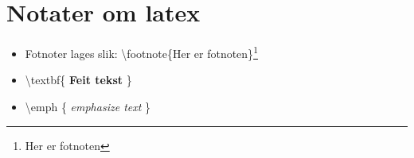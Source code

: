 \documentclass[norsk,9 pt]{report}
\begin{document}




%



%














\chapter{Notater om latex}
\begin{itemize}
	\item Fotnoter lages slik: \textbackslash footnote\{Her er fotnoten\}\footnote{Her er fotnoten}
	\item \textbackslash textbf\{ \textbf{Feit tekst} \}
	\item \textbackslash emph \{ \emph{emphasize text} \}
\end{itemize}

%
%
\end{document}
